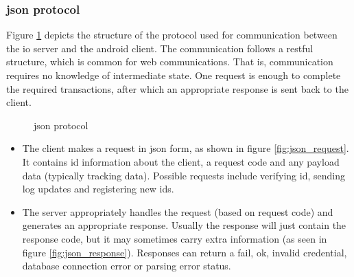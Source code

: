 \pagebreak
\subsubsection{\ac{json} protocol}
Figure \ref{fig:json_protocol} depicts the structure of the protocol used for communication between the \ac{io} server and the android client.
The communication follows a \ac{rest}ful structure, which is common for web communications.
That is, communication requires no knowledge of intermediate state.
One request is enough to complete the required transactions, after which an appropriate response is sent back to the client.

\begin{figure}[H]
\centering
\caption{\Ac{json} protocol}
\label{fig:json_protocol}
\end{figure}


\begin{itemize}
\item The client makes a request in \ac{json} form, as shown in figure \ref{fig:json_request}.
It contains \ac{id} information about the client, a request code and any payload data (typically tracking data). Possible requests include verifying \ac{id}, sending log updates and registering new \ac{id}s.
\item The server appropriately handles the request (based on request code) and generates an appropriate response. Usually the response will just contain the response code, but it may sometimes carry extra information (as seen in figure \ref{fig:json_response}).
Responses can return a fail, ok, invalid credential, database connection error or parsing error status.
\end{itemize}

